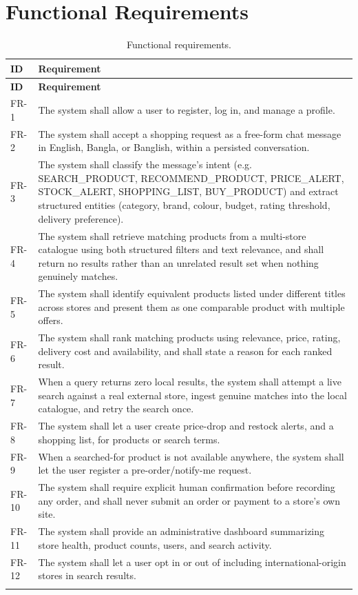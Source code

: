 \documentclass[12pt,a4paper]{report}
\begin{document}
\section{Functional Requirements}
\begin{longtable}{p{1.3cm}p{11.7cm}}
\toprule
\textbf{ID} & \textbf{Requirement} \\
\midrule
\endfirsthead
\toprule
\textbf{ID} & \textbf{Requirement} \\
\midrule
\endhead
FR-1 & The system shall allow a user to register, log in, and manage a profile. \\
FR-2 & The system shall accept a shopping request as a free-form chat message in English, Bangla, or
Banglish, within a persisted conversation. \\
FR-3 & The system shall classify the message's intent (e.g. SEARCH\_PRODUCT, RECOMMEND\_PRODUCT,
PRICE\_ALERT, STOCK\_ALERT, SHOPPING\_LIST, BUY\_PRODUCT) and extract structured entities (category,
brand, colour, budget, rating threshold, delivery preference). \\
FR-4 & The system shall retrieve matching products from a multi-store catalogue using both structured
filters and text relevance, and shall return no results rather than an unrelated result set when nothing
genuinely matches. \\
FR-5 & The system shall identify equivalent products listed under different titles across stores and
present them as one comparable product with multiple offers. \\
FR-6 & The system shall rank matching products using relevance, price, rating, delivery cost and
availability, and shall state a reason for each ranked result. \\
FR-7 & When a query returns zero local results, the system shall attempt a live search against a real
external store, ingest genuine matches into the local catalogue, and retry the search once. \\
FR-8 & The system shall let a user create price-drop and restock alerts, and a shopping list, for products
or search terms. \\
FR-9 & When a searched-for product is not available anywhere, the system shall let the user register a
pre-order/notify-me request. \\
FR-10 & The system shall require explicit human confirmation before recording any order, and shall never
submit an order or payment to a store's own site. \\
FR-11 & The system shall provide an administrative dashboard summarizing store health, product counts,
users, and search activity. \\
FR-12 & The system shall let a user opt in or out of including international-origin stores in search
results. \\
\bottomrule
\caption{Functional requirements.}
\end{longtable}
\end{document}
